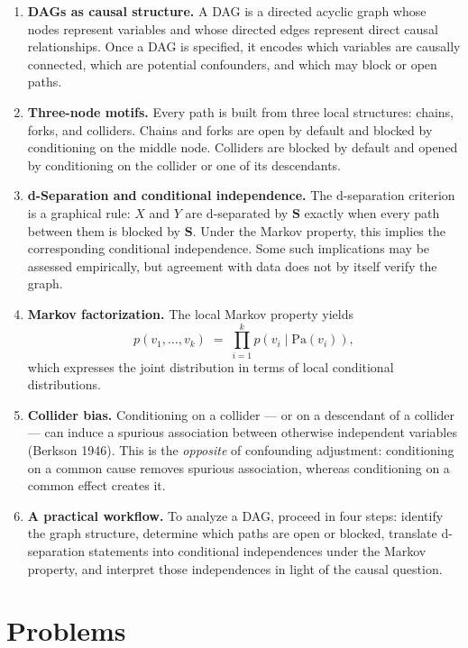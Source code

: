 \documentclass[
  a4paper,
]{book}
\newcommand{\Pa}{\mathrm{Pa}}
\begin{document}
\begin{enumerate}
\def\labelenumi{\arabic{enumi}.}
\item
  \textbf{DAGs as causal structure.} A DAG is a directed acyclic graph
  whose nodes represent variables and whose directed edges represent
  direct causal relationships. Once a DAG is specified, it encodes which
  variables are causally connected, which are potential confounders, and
  which may block or open paths.
\item
  \textbf{Three-node motifs.} Every path is built from three local
  structures: chains, forks, and colliders. Chains and forks are open by
  default and blocked by conditioning on the middle node. Colliders are
  blocked by default and opened by conditioning on the collider or one
  of its descendants.
\item
  \textbf{d-Separation and conditional independence.} The d-separation
  criterion is a graphical rule: \(X\) and \(Y\) are d-separated by
  \(\mathbf{S}\) exactly when every path between them is blocked by
  \(\mathbf{S}\). Under the Markov property, this implies the
  corresponding conditional independence. Some such implications may be
  assessed empirically, but agreement with data does not by itself
  verify the graph.
\item
  \textbf{Markov factorization.} The local Markov property yields
  \[p(v_1,\dots,v_k) \;=\; \prod_{i=1}^{k} p\!\left(v_i \mid \Pa(v_i)\right),\]
  which expresses the joint distribution in terms of local conditional
  distributions.
\item
  \textbf{Collider bias.} Conditioning on a collider --- or on a
  descendant of a collider --- can induce a spurious association between
  otherwise independent variables (Berkson 1946). This is the
  \emph{opposite} of confounding adjustment: conditioning on a common
  cause removes spurious association, whereas conditioning on a common
  effect creates it.
\item
  \textbf{A practical workflow.} To analyze a DAG, proceed in four
  steps: identify the graph structure, determine which paths are open or
  blocked, translate d-separation statements into conditional
  independences under the Markov property, and interpret those
  independences in light of the causal question.
\end{enumerate}

\section{Problems}\label{problems-1}
\end{document}
